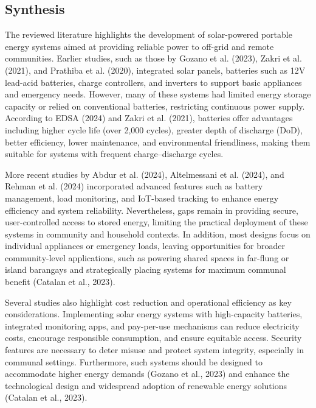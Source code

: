 {\subsection{Synthesis}
The reviewed literature highlights the development of solar-powered portable energy systems aimed at providing reliable power to off-grid and remote communities. Earlier studies, such as those by Gozano et al. (2023), Zakri et al. (2021), and Prathiba et al. (2020), integrated solar panels, batteries such as 12V lead-acid batteries, charge controllers, and inverters to support basic appliances and emergency needs. However, many of these systems had limited energy storage capacity or relied on conventional batteries, restricting continuous power supply. According to EDSA (2024) and Zakri et al. (2021),  batteries offer advantages including higher cycle life (over 2,000 cycles), greater depth of discharge (DoD), better efficiency, lower maintenance, and environmental friendliness, making them suitable for systems with frequent charge–discharge cycles.

More recent studies by Abdur et al. (2024), Altelmessani et al. (2024), and Rehman et al. (2024) incorporated advanced features such as battery management, load monitoring, and IoT-based tracking to enhance energy efficiency and system reliability. Nevertheless, gaps remain in providing secure, user-controlled access to stored energy, limiting the practical deployment of these systems in community and household contexts. In addition, most designs focus on individual appliances or emergency loads, leaving opportunities for broader community-level applications, such as powering shared spaces in far-flung or island barangays and strategically placing systems for maximum communal benefit (Catalan et al., 2023).

Several studies also highlight cost reduction and operational efficiency as key considerations. Implementing solar energy systems with high-capacity batteries, integrated monitoring apps, and pay-per-use mechanisms can reduce electricity costs, encourage responsible consumption, and ensure equitable access. Security features are necessary to deter misuse and protect system integrity, especially in communal settings. Furthermore, such systems should be designed to accommodate higher energy demands (Gozano et al., 2023) and enhance the technological design and widespread adoption of renewable energy solutions (Catalan et al., 2023).

}
